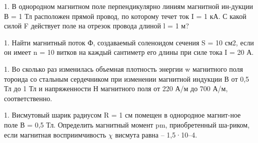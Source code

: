 1. В однородном магнитном поле перпендикулярно линиям магнитной ин-дукции В = 1 Тл расположен прямой провод, по которому течет ток I = 1 кА. С какой силой F действует поле на отрезок провода длиной l = 1 м?

1. Найти магнитный поток Ф, создаваемый соленоидом сечения S = 10 см2, если он имеет n = 10 витков на каждый сантиметр его длины при силе тока I = 20 А.

1. Во сколько раз изменилась объемная плотность энергии w магнитного поля тороида со стальным сердечником при изменении магнитной индукции В от 0,5 Тл до 1 Тл и напряженности Н магнитного поля от 220 А/м до 700 А/м, соответственно.

1. Висмутовый шарик радиусом R = 1 см помещен в однородное магнит-ное поле В = 0,5 Тл. Определить магнитный момент pm, приобретенный ша-риком, если магнитная восприимчивость $ \chi $ висмута равна – 1,5·10–4.